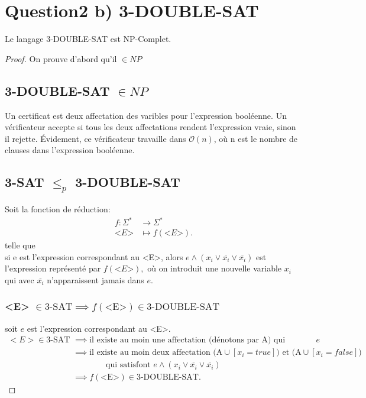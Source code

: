 \documentclass{article}
\theoremstyle{definition}
\theoremstyle{remark}
\begin{document}
\section*{Question2 b) 3-DOUBLE-SAT}
Le langage 3-DOUBLE-SAT est NP-Complet.
\begin{proof}
	On prouve d'abord qu'il $\in NP$ 
	\subsection {3-DOUBLE-SAT $\in NP$}
	Un certificat est deux affectation des varibles pour l'expression booléenne. Un vérificateur accepte si tous les deux affectations rendent l'expression vraie, sinon il rejette. Évidement, ce vérificateur travaille dans $\mathcal{O} \left ( n \right ) $, où n est le nombre de clauses dans l'expression booléenne.
	\subsection {3-SAT $\le_{p}$ 3-DOUBLE-SAT }
	Soit la fonction de réduction:
	\begin{align*}
		f: \Sigma^{*} &\longrightarrow \Sigma^{*} \\
		 \text{<}E\text{>}&\longmapsto f(\text{<}E\text{>})  
	.\end{align*}
	telle que \\
	si e est l'expression correspondant au <E>, alors $e\wedge\left( x_{i}\vee \overline{x_{i}} \vee \overline{x_{i}} \right) $ est l'expression représenté par $f\left( \text{<}E\text{>} \right),$ où on introduit une nouvelle variable $x_i$ qui avec $\overline{x_{i}} $ n'apparaissent jamais dans $e$.  	
	\subsubsection{<E> $\in \text{3-SAT} \implies f\left( \text{<E>} \right) \in \text{3-DOUBLE-SAT}$}
	soit $e$ est l'expression correspondant au <E>.
	\begin{align*}
		<E> \in \text{3-SAT} &\implies \text{il existe au moin une affectation (dénotons par A) qui satisfait }e\\
	&\implies \text{il existe au moin deux affectation (A}\cup [x_{i} =true] \text{) et (A} \cup [x_{i} = false]\text{)} \\ 
	&\qquad\qquad\text{qui satisfont } e \wedge \left( x_{i}\vee \overline{x_{i}} \vee \overline{x_{i}} \right)\\ 
	&\implies f\left( \text{<E>} \right) \in \text{3-DOUBLE-SAT}
	.\end{align*}

\end{proof}
\end{document}
